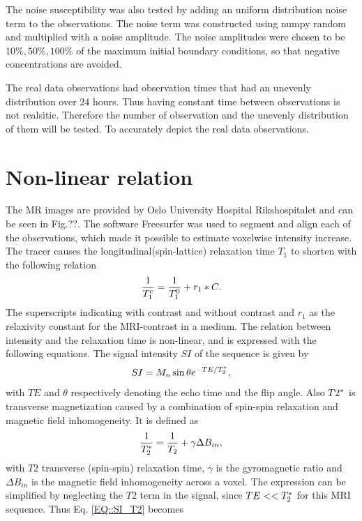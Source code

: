 \documentclass[11pt,a4paper]{article}
\begin{document}
The noise susceptibility was also tested by adding an uniform distribution noise term to the observations. The noise term was constructed using numpy random and multiplied with a noise amplitude. The noise amplitudes were chosen to be $ 10\%, 50\%, 100\%$ of the maximum initial boundary conditions, so that negative concentrations are avoided.  

The real data observations had observation times that had an unevenly distribution over 24 hours. Thus having  constant time between observations is not realsitic. Therefore the number of observation and the unevenly distribution of them will be tested. To accurately depict the real data observations. 



\section*{Non-linear relation}
The MR images are provided by Oslo University Hospital Rikshospitalet and can be seen in Fig.??. The software Freesurfer was used to segment and align each of the observations, which made it possible to estimate voxelwise intensity increase. The tracer causes the longitudinal(spin-lattice) relaxation time $T_{1}$ to shorten with the following relation
\begin{equation}
\frac{1}{T_{1}\sp{c}} = \frac{1}{T_{1}\sp{0}} + r_{1}*C .
\label{EQ::contrast}
\end{equation}
The superscripts indicating with contrast and without contrast and $r_1$ as the relaxivity constant for the MRI-contrast in a medium. The relation between intensity and the relaxation time is non-linear, and is expressed with the following equations. The signal intensity $SI$ of the sequence is given by
\begin{equation}
SI = M_{n} \sin \theta e\sp{ - TE/T_2\sp{*} },
\label{EQ::SI_T2}
\end{equation}
with  $TE$ and $\theta$ respectively denoting the echo time and the flip angle. Also $T2\sp{*}$ is transverse magnetization caused by a combination of spin-spin relaxation and magnetic field inhomogeneity. It is defined as 
\begin{equation}
\frac{1}{T_2\sp{*}} = \frac{1}{T_2} + \gamma \Delta B_{in} ,
\end{equation}
with $T2$ transverse (spin-spin) relaxation time, $\gamma$ is the gyromagnetic ratio and $\Delta B_{in}$ is the magnetic field inhomogeneity across a voxel. The expression can be simplified by neglecting the $T2$ term in the signal, since $TE <<T_2\sp{*}$ for this MRI sequence. Thus Eq. \ref{EQ::SI_T2} becomes 
\end{document}
